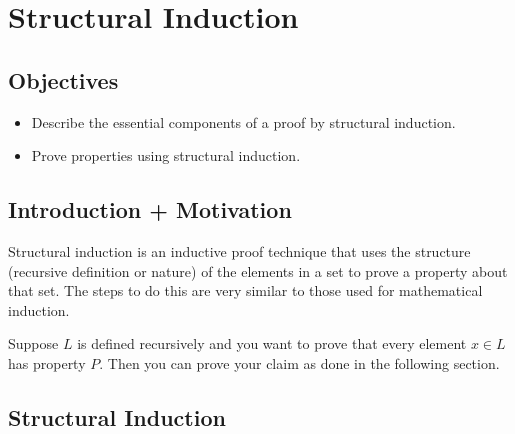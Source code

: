 \chapter{Structural Induction}

\section{Objectives}

\begin{itemize}
	\item Describe the essential components of a proof by structural induction.
	\item Prove properties using structural induction.
\end{itemize}

\section{Introduction + Motivation}

Structural induction is an inductive proof technique that uses the structure (recursive definition or nature) of the elements in a set to prove a property about that set.  The steps to do this are very similar to those used for mathematical induction.

Suppose $L$ is defined recursively and you want to prove that every element $x \in L$ has property $P$.  Then you can prove your claim as done in the following section.


\section{Structural Induction}

